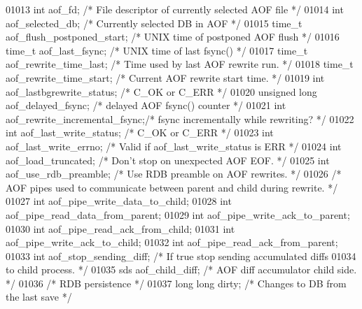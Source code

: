 \begin{DoxyCode}
{{{{{{{01013     \textcolor{keywordtype}{int} aof\_fd;       \textcolor{comment}{/* File descriptor of currently selected AOF file */}
01014     \textcolor{keywordtype}{int} aof\_selected\_db; \textcolor{comment}{/* Currently selected DB in AOF */}
01015     time\_t aof\_flush\_postponed\_start; \textcolor{comment}{/* UNIX time of postponed AOF flush */}
01016     time\_t aof\_last\_fsync;            \textcolor{comment}{/* UNIX time of last fsync() */}
01017     time\_t aof\_rewrite\_time\_last;   \textcolor{comment}{/* Time used by last AOF rewrite run. */}
01018     time\_t aof\_rewrite\_time\_start;  \textcolor{comment}{/* Current AOF rewrite start time. */}
01019     \textcolor{keywordtype}{int} aof\_lastbgrewrite\_status;   \textcolor{comment}{/* C\_OK or C\_ERR */}
01020     \textcolor{keywordtype}{unsigned} \textcolor{keywordtype}{long} aof\_delayed\_fsync;  \textcolor{comment}{/* delayed AOF fsync() counter */}
01021     \textcolor{keywordtype}{int} aof\_rewrite\_incremental\_fsync;\textcolor{comment}{/* fsync incrementally while rewriting? */}
01022     \textcolor{keywordtype}{int} aof\_last\_write\_status;      \textcolor{comment}{/* C\_OK or C\_ERR */}
01023     \textcolor{keywordtype}{int} aof\_last\_write\_errno;       \textcolor{comment}{/* Valid if aof\_last\_write\_status is ERR */}
01024     \textcolor{keywordtype}{int} aof\_load\_truncated;         \textcolor{comment}{/* Don't stop on unexpected AOF EOF. */}
01025     \textcolor{keywordtype}{int} aof\_use\_rdb\_preamble;       \textcolor{comment}{/* Use RDB preamble on AOF rewrites. */}
01026     \textcolor{comment}{/* AOF pipes used to communicate between parent and child during rewrite. */}
01027     \textcolor{keywordtype}{int} aof\_pipe\_write\_data\_to\_child;
01028     \textcolor{keywordtype}{int} aof\_pipe\_read\_data\_from\_parent;
01029     \textcolor{keywordtype}{int} aof\_pipe\_write\_ack\_to\_parent;
01030     \textcolor{keywordtype}{int} aof\_pipe\_read\_ack\_from\_child;
01031     \textcolor{keywordtype}{int} aof\_pipe\_write\_ack\_to\_child;
01032     \textcolor{keywordtype}{int} aof\_pipe\_read\_ack\_from\_parent;
01033     \textcolor{keywordtype}{int} aof\_stop\_sending\_diff;     \textcolor{comment}{/* If true stop sending accumulated diffs}
01034 \textcolor{comment}{                                      to child process. */}
01035     sds aof\_child\_diff;             \textcolor{comment}{/* AOF diff accumulator child side. */}
01036     \textcolor{comment}{/* RDB persistence */}
01037     \textcolor{keywordtype}{long} \textcolor{keywordtype}{long} dirty;                \textcolor{comment}{/* Changes to DB from the last save */}
}}}}}}}
\end{DoxyCode}
